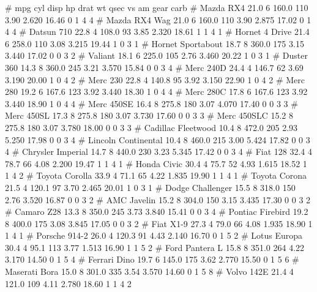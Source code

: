 \documentclass[
  a4paper,
]{article}
\newenvironment{Shaded}{\begin{snugshade}}{\end{snugshade}}
\newcommand{\NormalTok}[1]{#1}
\theoremstyle{definition}
\theoremstyle{definition}
\theoremstyle{definition}
\theoremstyle{definition}
\theoremstyle{remark}
\begin{document}
\begin{Shaded}
\begin{Highlighting}[]
\NormalTok{\#                      mpg cyl  disp  hp drat    wt  qsec vs am gear carb}
\NormalTok{\# Mazda RX4           21.0   6 160.0 110 3.90 2.620 16.46  0  1    4    4}
\NormalTok{\# Mazda RX4 Wag       21.0   6 160.0 110 3.90 2.875 17.02  0  1    4    4}
\NormalTok{\# Datsun 710          22.8   4 108.0  93 3.85 2.320 18.61  1  1    4    1}
\NormalTok{\# Hornet 4 Drive      21.4   6 258.0 110 3.08 3.215 19.44  1  0    3    1}
\NormalTok{\# Hornet Sportabout   18.7   8 360.0 175 3.15 3.440 17.02  0  0    3    2}
\NormalTok{\# Valiant             18.1   6 225.0 105 2.76 3.460 20.22  1  0    3    1}
\NormalTok{\# Duster 360          14.3   8 360.0 245 3.21 3.570 15.84  0  0    3    4}
\NormalTok{\# Merc 240D           24.4   4 146.7  62 3.69 3.190 20.00  1  0    4    2}
\NormalTok{\# Merc 230            22.8   4 140.8  95 3.92 3.150 22.90  1  0    4    2}
\NormalTok{\# Merc 280            19.2   6 167.6 123 3.92 3.440 18.30  1  0    4    4}
\NormalTok{\# Merc 280C           17.8   6 167.6 123 3.92 3.440 18.90  1  0    4    4}
\NormalTok{\# Merc 450SE          16.4   8 275.8 180 3.07 4.070 17.40  0  0    3    3}
\NormalTok{\# Merc 450SL          17.3   8 275.8 180 3.07 3.730 17.60  0  0    3    3}
\NormalTok{\# Merc 450SLC         15.2   8 275.8 180 3.07 3.780 18.00  0  0    3    3}
\NormalTok{\# Cadillac Fleetwood  10.4   8 472.0 205 2.93 5.250 17.98  0  0    3    4}
\NormalTok{\# Lincoln Continental 10.4   8 460.0 215 3.00 5.424 17.82  0  0    3    4}
\NormalTok{\# Chrysler Imperial   14.7   8 440.0 230 3.23 5.345 17.42  0  0    3    4}
\NormalTok{\# Fiat 128            32.4   4  78.7  66 4.08 2.200 19.47  1  1    4    1}
\NormalTok{\# Honda Civic         30.4   4  75.7  52 4.93 1.615 18.52  1  1    4    2}
\NormalTok{\# Toyota Corolla      33.9   4  71.1  65 4.22 1.835 19.90  1  1    4    1}
\NormalTok{\# Toyota Corona       21.5   4 120.1  97 3.70 2.465 20.01  1  0    3    1}
\NormalTok{\# Dodge Challenger    15.5   8 318.0 150 2.76 3.520 16.87  0  0    3    2}
\NormalTok{\# AMC Javelin         15.2   8 304.0 150 3.15 3.435 17.30  0  0    3    2}
\NormalTok{\# Camaro Z28          13.3   8 350.0 245 3.73 3.840 15.41  0  0    3    4}
\NormalTok{\# Pontiac Firebird    19.2   8 400.0 175 3.08 3.845 17.05  0  0    3    2}
\NormalTok{\# Fiat X1{-}9           27.3   4  79.0  66 4.08 1.935 18.90  1  1    4    1}
\NormalTok{\# Porsche 914{-}2       26.0   4 120.3  91 4.43 2.140 16.70  0  1    5    2}
\NormalTok{\# Lotus Europa        30.4   4  95.1 113 3.77 1.513 16.90  1  1    5    2}
\NormalTok{\# Ford Pantera L      15.8   8 351.0 264 4.22 3.170 14.50  0  1    5    4}
\NormalTok{\# Ferrari Dino        19.7   6 145.0 175 3.62 2.770 15.50  0  1    5    6}
\NormalTok{\# Maserati Bora       15.0   8 301.0 335 3.54 3.570 14.60  0  1    5    8}
\NormalTok{\# Volvo 142E          21.4   4 121.0 109 4.11 2.780 18.60  1  1    4    2}
\end{Highlighting}
\end{Shaded}
\end{document}
